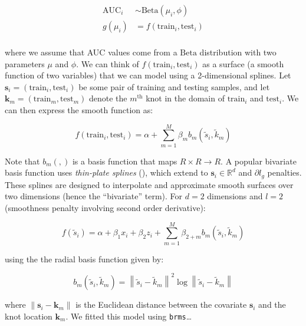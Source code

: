 \documentclass[
  doc,
  floatsintext,
  longtable,
  a4paper,
  nolmodern,
  notxfonts,
  notimes,
  colorlinks=true,linkcolor=blue,citecolor=blue,urlcolor=blue]{apa7}
\begin{document}
\[
\begin{aligned}
\text{AUC}_{i} &\sim \mathrm{Beta}(\mu_{i}, \phi)\\
g(\mu_{i}) &= f \left(\text{train}_{i}, \text{test}_{i} \right)\\
\end{aligned}
\]

where we assume that AUC values come from a \(\mathrm{Beta}\)
distribution with two parameters \(\mu\) and \(\phi\). We can think of
\(f \left(\text{train}_{i}, \text{test}_{i} \right)\) as a surface (a
smooth function of two variables) that we can model using a
2-dimensional splines. Let
\(\mathbf{s}_{i} = \left(\text{train}_{i}, \text{test}_{i} \right)\) be
some pair of training and testing samples, and let
\(\mathbf{k}_{m} = \left(\text{train}_{m}, \text{test}_{m} \right)\)
denote the \(m^{\text{th}}\) knot in the domain of \(\text{train}_{i}\)
and \(\text{test}_{i}\). We can then express the smooth function as:

\[
f \left(\text{train}_{i}, \text{test}_{i} \right) = \alpha + \sum_{m=1}^M \beta_{m} b_{m} \left(\tilde{s}_{i}, \tilde{k}_{m} \right)
\]

Note that \(b_{m}(,)\) is a basis function that maps
\(R \times R \rightarrow R\). A popular bivariate basis function uses
\emph{thin-plate splines} (), which
extend to \(\mathbf{s}_{i} \in \mathbb{R}^{d}\) and \(\partial l_{g}\)
penalties. These splines are designed to interpolate and approximate
smooth surfaces over two dimensions (hence the ``bivariate'' term). For
\(d=2\) dimensions and \(l=2\) (smoothness penalty involving second
order derivative):

\[
f \left(\tilde{s}_{i} \right) = \alpha + \beta_{1} x_{i} + \beta_{2} z_{i} +\sum_{m=1}^{M} \beta_{2+m} b_m\left(\tilde{s}_i, \tilde{k}_m\right)
\]

using the the radial basis function given by:

\[
b_m\left(\tilde{s}_i, \tilde{k}_m\right)=\left\|\tilde{s}_i-\tilde{k}_m\right\|^2 \log \left\|\tilde{s}_i-\tilde{k}_m\right\|
\]

where \(\left\|\mathbf{s}_i-\mathbf{k}_{m}\right\|\) is the Euclidean
distance between the covariate \(\mathbf{s}_{i}\) and the knot location
\(\mathbf{k}_{m}\). We fitted this model using \texttt{brms}\ldots{}
\end{document}
